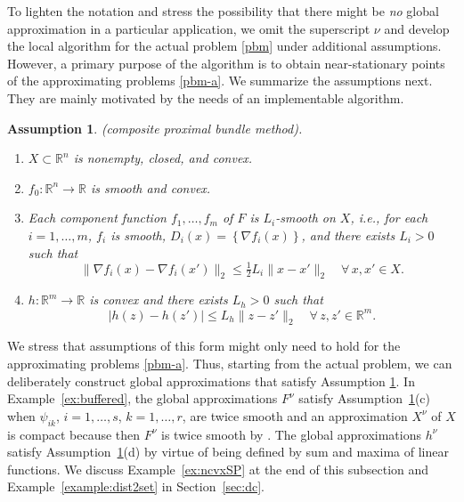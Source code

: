 \documentclass[smallextended,envcountsect]{svjour3}
\newtheorem{assumption}{Assumption}
\newcommand{\col}[1]{\left\{#1\right\}}
\newcommand{\fc}[2]{: #1 \rightarrow #2}
\renewcommand{\Re}{\mathbb{R}}
\begin{document}
To lighten the notation and stress the possibility that there might be {\em no} global approximation in a particular application, we omit the superscript $\nu$ and develop the local algorithm for the actual problem \eqref{pbm} under additional assumptions. However, a primary purpose of the algorithm is to obtain near-stationary points of the approximating problems \eqref{pbm-a}. 
%
We summarize the assumptions next. They are mainly motivated by the needs of an implementable algorithm. 

\begin{assumption}{\rm (composite proximal bundle method).}\label{assumptions}
\mbox{ }
\begin{enumerate}[label=(\alph*), start=1]
\item $X\subset \Re^n$ is nonempty, closed, and convex.
\item $f_0\fc{\Re^n}{\Re}$ is smooth and convex.
\item Each component function $f_1, \dots, f_m$ of $F$ is $L_i$-smooth on $X$, i.e., for each $i=1, \dots, m$, $f_i$ is smooth, $D_i(x)=\col{\nabla f_i(x)}$, and there exists $L_i>0$ such that
\[
\big\|\nabla f_i(x)-\nabla f_i(x')\big\|_2 \leq \tfrac{1}{2}L_i \|x-x'\|_2\quad \forall\, x,x'\in X.
\]

\item $h\fc{\Re^m}{\Re}$ is convex and there exists $L_h>0$ such that
\[
\big|h(z)-h(z')\big|\leq {L_h}\|z-z'\|_2\quad \forall\, z,z'\in \Re^m.
\]

\end{enumerate}
\end{assumption}

We stress that assumptions of this form might only need to hold for the approximating problems \eqref{pbm-a}. Thus, starting from the actual problem, we can deliberately construct global approximations that satisfy Assumption \ref{assumptions}. In Example~\ref{ex:buffered}, the global approximations $F^\nu$ satisfy Assumption~\ref{assumptions}(c) when $\psi_{ik}$, $i=1, \dots, s$, $k=1, \dots, r$, are twice smooth and an approximation $X^\nu$ of $X$ is compact because then $F^\nu$ is twice smooth by \cite[Example 4.16]{Royset_Wets_2021}. The global approximations $h^\nu$ satisfy Assumption~\ref{assumptions}(d) by virtue of being defined by sum and maxima of linear functions. We discuss Example~\ref{ex:ncvxSP} at the end of this subsection and Example~\ref{example:dist2set} in Section~\ref{sec:dc}. 
\end{document}
